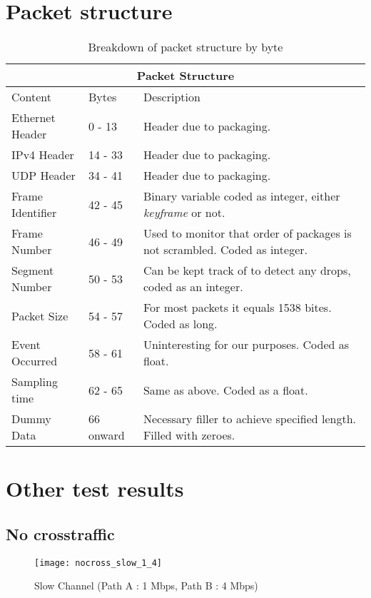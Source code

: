 \chapter{Packet structure}
\thispagestyle{empty}%
\begin{table}[htbp]
\caption{Breakdown of packet structure by byte}
\break
\setlength{\arrayrulewidth}{1mm}
\setlength{\tabcolsep}{12pt}
\renewcommand{\arraystretch}{1.5}
 {
\begin{tabular}{ |p{3cm}|p{1.5cm}|p{7cm}|  }
\hline
\multicolumn{3}{|c|}{Packet Structure} \\
\hline
Content & Bytes & Description \\
\hline
Ethernet Header & 0 - 13 & Header due to packaging. \\
IPv4 Header & 14 - 33 & Header due to packaging. \\
UDP Header & 34 - 41 & Header due to packaging. \\
Frame Identifier & 42 - 45 & Binary variable coded as integer, either \textit{keyframe} or not. \\
Frame Number & 46 - 49 & Used to monitor that order of packages is not scrambled. Coded as integer. \\
Segment Number & 50 - 53 & Can be kept track of to detect any drops, coded as an integer. \\
Packet Size & 54 - 57 & For most packets it equals 1538 bites. Coded as long. \\
Event Occurred & 58 - 61 & Uninteresting for our purposes. Coded as float. \\
Sampling time & 62 - 65 & Same as above. Coded as a float. \\
Dummy Data & 66 onward & Necessary filler to achieve specified length. Filled with zeroes. \\
\hline
\end{tabular}
}
\end{table}

\chapter{Other test results}
\thispagestyle{empty}

\section{No crosstraffic}


\begin{figure}[!ht]
\caption{Slow Channel (Path A : 1 Mbps, Path B : 4 Mbps)}
\centering
\texttt{[image: nocross\_slow\_1\_4]}
\end{figure}

